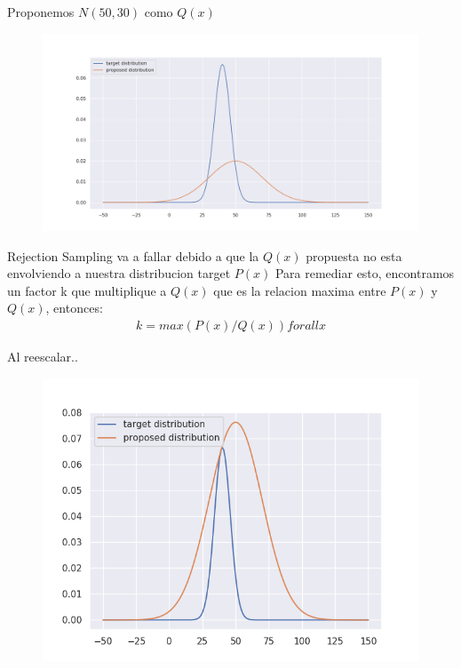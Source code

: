 \documentclass[11pt,a4paper]{article}
\begin{document}
	Proponemos $N(50, 30)$ como $Q(x)$
	\begin{figure}[H]
  			\centering
    			\includegraphics[width=14cm]{imagenes/proposed}
	\end{figure}
	Rejection Sampling va a fallar debido a que la $Q(x)$ propuesta no esta envolviendo a nuestra distribucion target $P(x)$
	Para remediar esto, encontramos un factor k que multiplique a $Q(x)$ que es la relacion maxima entre $P(x)$ y $Q(x)$, entonces:
	\begin{align*}
		k = max(P(x) / Q(x)) for all x
	\end{align*}

	Al reescalar..
	\begin{figure}[H]
  			\centering
    			\includegraphics[width=18cm]{imagenes/proposed_escaled}
	\end{figure}
\end{document}
